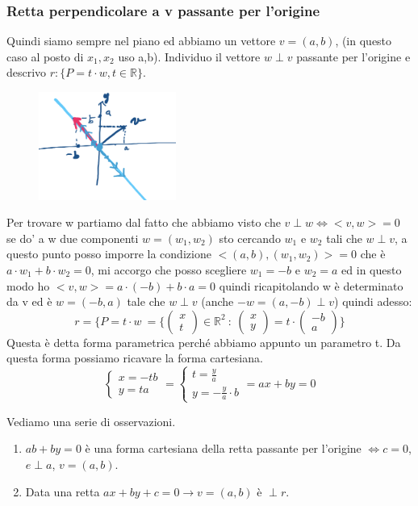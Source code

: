\subsubsection{Retta perpendicolare a v passante per l'origine}
Quindi siamo sempre nel piano ed abbiamo un vettore $v = (a,b)$, (in questo caso al posto di $x_1, x_2$ uso a,b). Individuo il vettore $w \perp v$ passante per l'origine e descrivo $r: \{P = t\cdot w, t \in \mathbb{R}\}$. \\
\begin{figure}
    \vspace{-20pt}
    \centering
    \includegraphics[width=4.5cm]{images/retta-perpendicolare-in-R3.png}
\end{figure}
Per trovare w partiamo dal fatto che abbiamo visto che $v \perp w \Longleftrightarrow <v,w> = 0$ se do' a w due componenti $w = (w_1, w_2)$ sto cercando $w_1$ e $w_2$ tali che $w \perp v$, a questo punto posso imporre la condizione $<(a,b), (w_1, w_2)> = 0$ che è $a \cdot w_1 + b \cdot w_2 = 0$, mi accorgo che posso scegliere $w_1 = -b$ e $w_2 = a$ ed in questo modo ho $<v,w> = a \cdot (-b) + b \cdot a = 0$ quindi ricapitolando w è determinato da v ed è $w = (-b,a)$ tale che $w \perp v$ (anche $-w = (a, -b) \perp v$) quindi adesso:
\[r = \{P = t \cdot w\ = \{\begin{pmatrix}x\\t\end{pmatrix}\in \mathbb{R}^2 \::\: \begin{pmatrix}x\\y\end{pmatrix}=t \cdot \begin{pmatrix}-b\\a\end{pmatrix}\}\]
Questa è detta forma parametrica perché abbiamo appunto un parametro t. Da questa forma possiamo ricavare la forma cartesiana.
\[\begin{cases}x = -tb \\ y = ta\end{cases} = \begin{cases}t = \frac{y}{a}\\ y= -\frac{y}{a}\cdot b\end{cases} = ax + by = 0\]
\begin{observation}
Vediamo una serie di osservazioni.
\begin{enumerate}
    \item $ab + by = 0$ è una forma cartesiana della retta passante per l'origine $\Longleftrightarrow c = 0$, $e \perp a$, $v = (a,b)$.
    \item Data una retta $ax + by + c = 0 \rightarrow v = (a,b)$ è $\perp r$.
\end{enumerate}
\end{observation}

